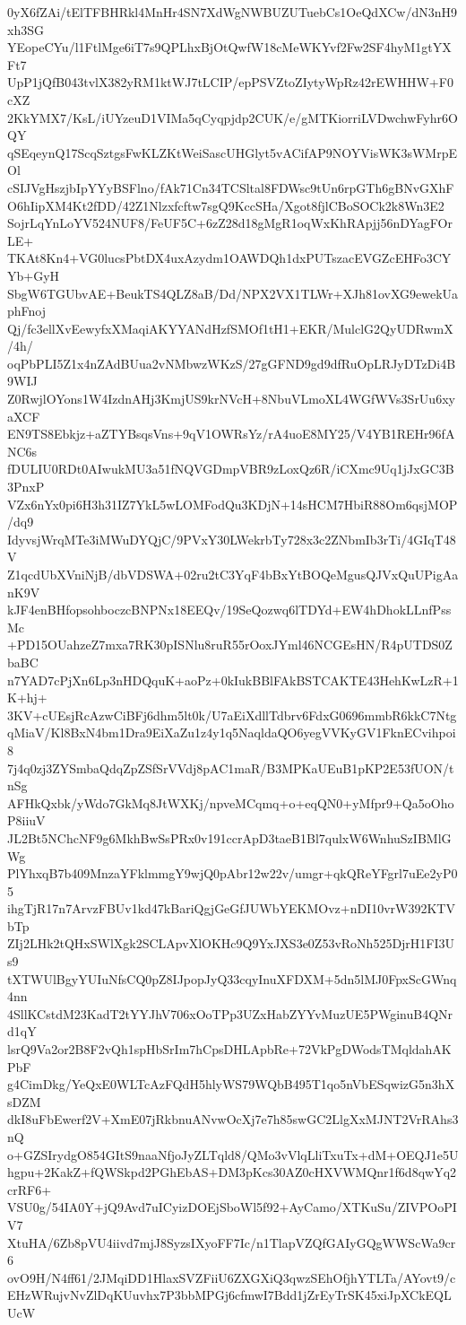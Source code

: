 0yX6fZAi/tElTFBHRkl4MnHr4SN7XdWgNWBUZUTuebCs1OeQdXCw/dN3nH9xh3SG
YEopeCYu/l1FtlMge6iT7s9QPLhxBjOtQwfW18cMeWKYvf2Fw2SF4hyM1gtYXFt7
UpP1jQfB043tvlX382yRM1ktWJ7tLCIP/epPSVZtoZIytyWpRz42rEWHHW+F0cXZ
2KkYMX7/KsL/iUYzeuD1VIMa5qCyqpjdp2CUK/e/gMTKiorriLVDwchwFyhr6OQY
qSEqeynQ17ScqSztgsFwKLZKtWeiSascUHGlyt5vACifAP9NOYVisWK3sWMrpEOl
cSIJVgHszjbIpYYyBSFlno/fAk71Cn34TCSltal8FDWsc9tUn6rpGTh6gBNvGXhF
O6hIipXM4Kt2fDD/42Z1Nlzxfcftw7sgQ9KccSHa/Xgot8fjlCBoSOCk2k8Wn3E2
SojrLqYnLoYV524NUF8/FeUF5C+6zZ28d18gMgR1oqWxKhRApjj56nDYagFOrLE+
TKAt8Kn4+VG0lucsPbtDX4uxAzydm1OAWDQh1dxPUTszacEVGZcEHFo3CYYb+GyH
SbgW6TGUbvAE+BeukTS4QLZ8aB/Dd/NPX2VX1TLWr+XJh81ovXG9ewekUaphFnoj
Qj/fc3ellXvEewyfxXMaqiAKYYANdHzfSMOf1tH1+EKR/MulclG2QyUDRwmX/4h/
oqPbPLI5Z1x4nZAdBUua2vNMbwzWKzS/27gGFND9gd9dfRuOpLRJyDTzDi4B9WIJ
Z0RwjlOYons1W4IzdnAHj3KmjUS9krNVcH+8NbuVLmoXL4WGfWVs3SrUu6xyaXCF
EN9TS8Ebkjz+aZTYBsqsVns+9qV1OWRsYz/rA4uoE8MY25/V4YB1REHr96fANC6s
fDULIU0RDt0AIwukMU3a51fNQVGDmpVBR9zLoxQz6R/iCXmc9Uq1jJxGC3B3PnxP
VZx6nYx0pi6H3h31IZ7YkL5wLOMFodQu3KDjN+14sHCM7HbiR88Om6qsjMOP/dq9
IdyvsjWrqMTe3iMWuDYQjC/9PVxY30LWekrbTy728x3c2ZNbmIb3rTi/4GIqT48V
Z1qcdUbXVniNjB/dbVDSWA+02ru2tC3YqF4bBxYtBOQeMgusQJVxQuUPigAanK9V
kJF4enBHfopsohboczcBNPNx18EEQv/19SeQozwq6lTDYd+EW4hDhokLLnfPssMc
+PD15OUahzeZ7mxa7RK30pISNlu8ruR55rOoxJYml46NCGEsHN/R4pUTDS0ZbaBC
n7YAD7cPjXn6Lp3nHDQquK+aoPz+0kIukBBlFAkBSTCAKTE43HehKwLzR+1K+hj+
3KV+cUEsjRcAzwCiBFj6dhm5lt0k/U7aEiXdllTdbrv6FdxG0696mmbR6kkC7Ntg
qMiaV/Kl8BxN4bm1Dra9EiXaZu1z4y1q5NaqldaQO6yegVVKyGV1FknECvihpoi8
7j4q0zj3ZYSmbaQdqZpZSfSrVVdj8pAC1maR/B3MPKaUEuB1pKP2E53fUON/tnSg
AFHkQxbk/yWdo7GkMq8JtWXKj/npveMCqmq+o+eqQN0+yMfpr9+Qa5oOhoP8iiuV
JL2Bt5NChcNF9g6MkhBwSsPRx0v191ccrApD3taeB1Bl7qulxW6WnhuSzIBMlGWg
PlYhxqB7b409MnzaYFklmmgY9wjQ0pAbr12w22v/umgr+qkQReYFgrl7uEe2yP05
ihgTjR17n7ArvzFBUv1kd47kBariQgjGeGfJUWbYEKMOvz+nDI10vrW392KTVbTp
ZIj2LHk2tQHxSWlXgk2SCLApvXlOKHc9Q9YxJXS3e0Z53vRoNh525DjrH1FI3Us9
tXTWUlBgyYUIuNfsCQ0pZ8IJpopJyQ33cqyInuXFDXM+5dn5lMJ0FpxScGWnq4nn
4SllKCstdM23KadT2tYYJhV706xOoTPp3UZxHabZYYvMuzUE5PWginuB4QNrd1qY
lsrQ9Va2or2B8F2vQh1spHbSrIm7hCpsDHLApbRe+72VkPgDWodsTMqldahAKPbF
g4CimDkg/YeQxE0WLTcAzFQdH5hlyWS79WQbB495T1qo5nVbESqwizG5n3hXsDZM
dkI8uFbEwerf2V+XmE07jRkbnuANvwOcXj7e7h85swGC2LlgXxMJNT2VrRAhs3nQ
o+GZSIrydgO854GItS9naaNfjoJyZLTqld8/QMo3vVlqLliTxuTx+dM+OEQJ1e5U
hgpu+2KakZ+fQWSkpd2PGhEbAS+DM3pKcs30AZ0cHXVWMQnr1f6d8qwYq2crRF6+
VSU0g/54IA0Y+jQ9Avd7uICyizDOEjSboWl5f92+AyCamo/XTKuSu/ZIVPOoPIV7
XtuHA/6Zb8pVU4iivd7mjJ8SyzsIXyoFF7Ic/n1TlapVZQfGAIyGQgWWScWa9cr6
ovO9H/N4ff61/2JMqiDD1HlaxSVZFiiU6ZXGXiQ3qwzSEhOfjhYTLTa/AYovt9/c
EHzWRujvNvZlDqKUuvhx7P3bbMPGj6cfmwI7Bdd1jZrEyTrSK45xiJpXCkEQLUcW
